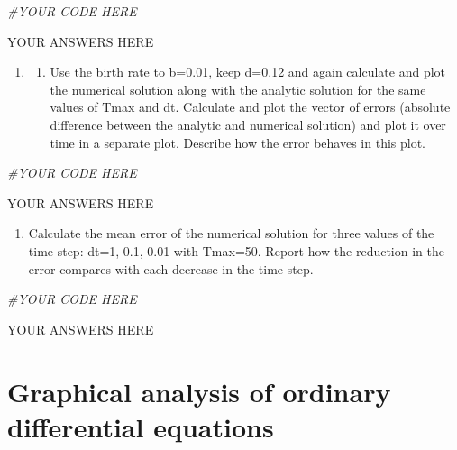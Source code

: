 \documentclass[
]{book}
\newenvironment{Shaded}{\begin{snugshade}}{\end{snugshade}}
\newcommand{\CommentTok}[1]{\textcolor[rgb]{0.56,0.35,0.01}{\textit{#1}}}
\providecommand{\tightlist}{%
  \setlength{\itemsep}{0pt}\setlength{\parskip}{0pt}}
\theoremstyle{definition}
\theoremstyle{definition}
\theoremstyle{definition}
\theoremstyle{remark}
\begin{document}
\begin{Shaded}
\begin{Highlighting}[]
\CommentTok{\#YOUR CODE HERE}
\end{Highlighting}
\end{Shaded}

YOUR ANSWERS HERE

\begin{enumerate}
\def\labelenumi{\arabic{enumi}.}
\setcounter{enumi}{2}
\item
  \begin{enumerate}
  \def\labelenumii{\alph{enumii})}
  \tightlist
  \item
    Use the birth rate to b=0.01, keep d=0.12 and again calculate and plot the numerical solution along with the analytic solution for the same values of Tmax and dt. Calculate and plot the vector of errors (absolute difference between the analytic and numerical solution) and plot it over time in a separate plot. Describe how the error behaves in this plot.
  \end{enumerate}
\end{enumerate}

\begin{Shaded}
\begin{Highlighting}[]
\CommentTok{\#YOUR CODE HERE}
\end{Highlighting}
\end{Shaded}

YOUR ANSWERS HERE

\begin{enumerate}
\def\labelenumi{\alph{enumi})}
\setcounter{enumi}{1}
\tightlist
\item
  Calculate the mean error of the numerical solution for three values of the time step: dt=1, 0.1, 0.01 with Tmax=50. Report how the reduction in the error compares with each decrease in the time step.
\end{enumerate}

\begin{Shaded}
\begin{Highlighting}[]
\CommentTok{\#YOUR CODE HERE}
\end{Highlighting}
\end{Shaded}

YOUR ANSWERS HERE

\hypertarget{graphical-analysis-of-ordinary-differential-equations}{%
\chapter{Graphical analysis of ordinary differential equations}\label{graphical-analysis-of-ordinary-differential-equations}}
\end{document}
